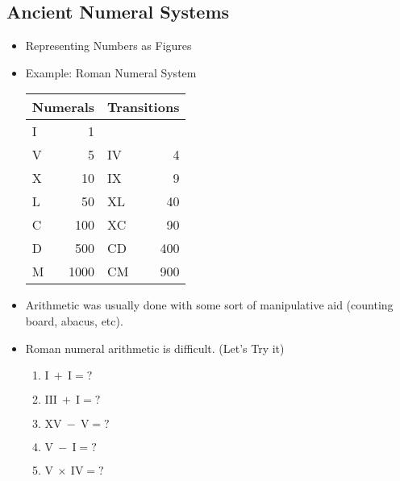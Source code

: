 \documentclass{article}
\begin{document}
\subsection{Ancient Numeral Systems}
\begin{itemize}
    \item Representing Numbers as Figures
    \item Example: Roman Numeral System
    
    \begin{tabular}{|lr|lr|}
    \hline
    \multicolumn{2}{|c|}{Numerals} & \multicolumn{2}{|c|}{Transitions} \\
    \hline
    I & 1 & &\\
    V & 5 & IV & 4\\
    X & 10 & IX & 9\\
    L & 50 & XL & 40 \\
    C & 100 & XC & 90\\
    D & 500 & CD & 400\\ 
    M & 1000 & CM & 900\\
    \hline
    \end{tabular}
    \item Arithmetic was usually done with some sort of manipulative aid (counting board, abacus, etc).
    \item Roman numeral arithmetic is difficult. (Let's Try it)
    \begin{enumerate}
        \item $\mathrm{I}\ +\ \mathrm{I}=?$
        \item $\mathrm{III}\ +\ \mathrm{I}=?$
        \item $\mathrm{XV}\ -\ \mathrm{V}=?$
        \item $\mathrm{V}\ -\ \mathrm{I}=?$
        \item $\mathrm{V}\ \times\ \mathrm{IV}=?$
    \end{enumerate}
\end{itemize}
\end{document}
